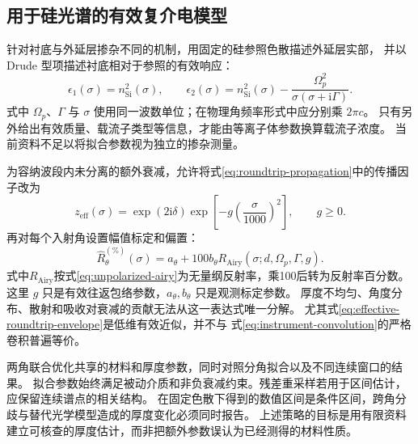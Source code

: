 \subsection{用于硅光谱的有效复介电模型}
针对衬底与外延层掺杂不同的机制，用固定的硅参照色散描述外延层实部，
并以 Drude 型项描述衬底相对于参照的有效响应：
\begin{equation}
 \epsilon_1(\sigma)=n_{\mathrm{Si}}^2(\sigma),\qquad
 \epsilon_2(\sigma)=n_{\mathrm{Si}}^2(\sigma)
 -\frac{\Omega_p^2}{\sigma(\sigma+\mathrm{i}\Gamma)}.
 \label{eq:silicon-drude-effective}
\end{equation}
式中 $\Omega_p$、$\Gamma$ 与 $\sigma$ 使用同一波数单位；在物理角频率形式中应分别乘 $2\pi c$。
只有另外给出有效质量、载流子类型等信息，才能由等离子体参数换算载流子浓度。
当前资料不足以将拟合参数视为独立的掺杂测量。

为容纳波段内未分离的额外衰减，允许将式\eqref{eq:roundtrip-propagation}中的传播因子改为
\begin{equation}
 z_{\mathrm{eff}}(\sigma)=\exp(2\mathrm{i}\delta)
 \exp\!\left[-g\left(\frac{\sigma}{1000}\right)^2\right],\qquad g\geq0.
 \label{eq:effective-roundtrip-envelope}
\end{equation}
再对每个入射角设置幅值标定和偏置：
\begin{equation}
 \widehat R_\theta^{(\%)}(\sigma)=a_\theta+100b_\theta
 R_{\mathrm{Airy}}(\sigma;d,\Omega_p,\Gamma,g).
 \label{eq:silicon-observation-model}
\end{equation}
式中$R_{\mathrm{Airy}}$按式\eqref{eq:unpolarized-airy}为无量纲反射率，乘100后转为反射率百分数。这里 $g$ 只是有效往返包络参数，$a_\theta,b_\theta$ 只是观测标定参数。
厚度不均匀、角度分布、散射和吸收对衰减的贡献无法从这一表达式唯一分解。
尤其式\eqref{eq:effective-roundtrip-envelope}是低维有效近似，并不与
式\eqref{eq:instrument-convolution}的严格卷积普遍等价。

两角联合优化共享的材料和厚度参数，同时对照分角拟合以及不同连续窗口的结果。
拟合参数始终满足被动介质和非负衰减约束。残差重采样若用于区间估计，应保留连续谱点的相关结构\cite{Kunsch1989}。
在固定色散下得到的数值区间是条件区间，跨角分歧与替代光学模型造成的厚度变化必须同时报告。
上述策略的目标是用有限资料建立可核查的厚度估计，而非把额外参数误认为已经测得的材料性质。
